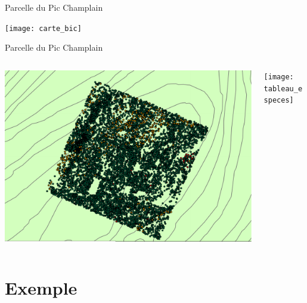 \documentclass{eecslides}
\begin{document}

	\begin{frame}{Parcelle du Pic Champlain}
				\begin{center}
					\texttt{[image: carte\_bic]}
				\end{center}
	\end{frame}


	\begin{frame}{Parcelle du Pic Champlain}
		\begin{columns}
			\begin{column}{0.6\textwidth}
				\begin{center}
					\includegraphics[height=0.5\textheight]{carte_arbres}
				\end{center}
			\end{column}
			\begin{column}{0.4\textwidth}
				\begin{center}
					\texttt{[image: tableau\_especes]}
				\end{center}
			\end{column}
		\end{columns}	    	
	\end{frame}

\section{Exemple}
\end{document}
